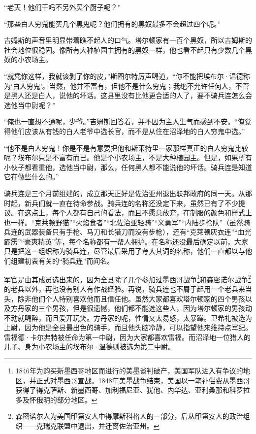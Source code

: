 \par “老天！他们干吗不另外买个厨子呢？”
\par “那些白人穷鬼能买几个黑鬼呢？他们拥有的黑奴最多不会超过四个呢。”
\par 吉姆斯的声音里明显带着瞧不起人的口气。塔尔顿家有一百个黑奴，所以吉姆斯的社会地位很稳固。像所有大种植园主拥有的黑奴一样，他也看不起只有少数几个黑奴的小农场主。
\par “就凭你这样，我就该剥了你的皮，”斯图尔特厉声喝道，“你不能把埃布尔·温德称为‘白人穷鬼’。当然，他并不富有，但他不是什么穷鬼；我绝不允许任何人，不管是黑人还是白人，说他的坏话。这县里没有比他更合适的人了，要不骑兵连怎么会选他当中尉呢？”
\par “俺也一直想不通呢，少爷。”吉姆斯回答着，并不因为主人生气而感到不安。“俺觉得他们应该从有钱的白人老爷中选长官，而不是从住在沼泽地的白人穷鬼中选。”
\par “他不是白人穷鬼！你是不是有意要把他和斯莱特里一家那样真正的白人穷鬼比较呢？埃布尔只是不富有而已。他是个小农场主，不是大种植园主。但是，如果所有小伙子都看重他，选他当中尉，那么，任何黑人都不能说他的坏话。骑兵连是知道它在做些什么的。”
\par 骑兵连是三个月前组建的，成立那天正好是佐治亚州退出联邦政府的同一天。从那时起，新兵们就一直在待命参战。骑兵连的名称还没定下来，虽然已有了不少提议。在这点上，每个人都有自己的看法，而且不愿意放弃，在制服的颜色和样式上也一样。“克莱顿野猫”“火焰食者”“北佐治亚轻骑”“义勇军”“内陆步枪队”（虽然骑兵连的武器装备只有手枪、马刀和长猎刀而没有步枪），还有“克莱顿灰衣连”“血光霹雳”“豪爽精英”等，每个名称都有一帮人拥护。在名称还没最后确定以前，大家只是把这一组织称为骑兵连，尽管最后采用了夸大其词的名称，他们一直都以与他们组建初衷有关的“骑兵连”而闻名。
\par 军官是由其成员选出来的，因为全县除了几个参加过墨西哥战争\footnote{1846年为购买新墨西哥地区而进行的美墨谈判破产，美国军队进入有争议的地区，并正式对墨西哥宣战。1848年美墨战争结束，美国以一笔补偿费从墨西哥获得了得克萨斯、新墨西哥、加利福尼亚、犹他、内华达、亚利桑那和科罗拉多及怀俄明的部分地区。}和森密诺尔战争\footnote{森密诺尔人为美国印第安人中得摩斯科格人的一部分，后从印第安人的政治组织——克瑞克联盟中退出，并迁离佐治亚州。}的老兵以外，再也没有别人有作战经验。再说，骑兵连也不屑于起用一个老兵来当头，除非他们个人特别喜欢他而且信任他。虽然大家都喜欢塔尔顿家的四个男孩以及方丹家的三个男孩，但是很遗憾，他们都不能选这些人，因为塔尔顿家的男孩动不动就喝醉，而且爱开玩笑。方丹家的呢，性情又太易怒，太暴躁。卫希礼被选为上尉，因为他是全县最出色的骑手，而且他头脑冷静，可以指望他来维持点军纪。雷福德·卡尔弗特被任命为第一中尉，因为大家都喜欢雷福。而沼泽地一位猎人的儿子、身为小农场主的埃布尔·温德则被选为第二中尉。

